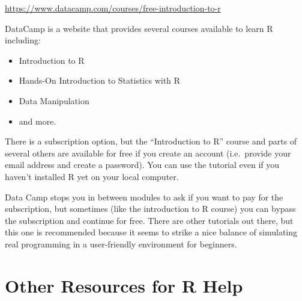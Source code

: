 \documentclass[]{article}
\begin{document}
\url{https://www.datacamp.com/courses/free-introduction-to-r}

DataCamp is a website that provides several courses available to learn R
including:

\begin{itemize}
\itemsep1pt\parskip0pt
\item
  Introduction to R
\item
  Hands-On Introduction to Statistics with R
\item
  Data Manipulation
\item
  and more.
\end{itemize}

There is a subscription option, but the ``Introduction to R'' course and
parts of several others are available for free if you create an account
(i.e.~provide your email address and create a password). You can use the
tutorial even if you haven't installed R yet on your local computer.

Data Camp stops you in between modules to ask if you want to pay for the
subscription, but sometimes (like the introduction to R course) you can
bypass the subscription and continue for free. There are other tutorials
out there, but this one is recommended because it seems to strike a nice
balance of simulating real programming in a user-friendly environment
for beginners.

\section{Other Resources for R Help}\label{other-resources-for-r-help}
\end{document}

